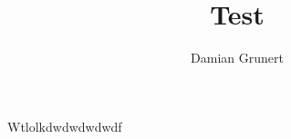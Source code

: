 \documentclass[a4paper]{article}
\author{Damian Grunert}
\title{Test}
\theoremstyle{definition}
\begin{document}
\maketitle
\tableofcontents
Wtlolkdwdwdwdwdf
\end{document}

